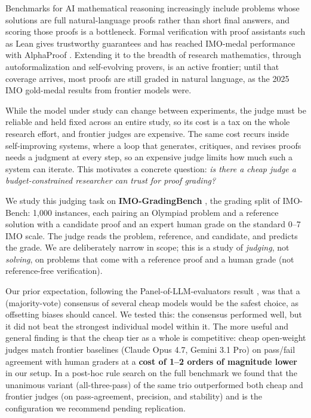 \documentclass{article}
\begin{document}
Benchmarks for AI mathematical reasoning increasingly include problems whose
solutions are full natural-language proofs rather than short final answers, and
scoring those proofs is a bottleneck. Formal verification with proof assistants
such as Lean \citep{moura2021lean} gives trustworthy guarantees and has
reached IMO-medal performance with AlphaProof \citep{hubert2025alphaproof}. Extending it to the breadth of
research mathematics, through autoformalization and self-evolving provers, is an
active frontier; until that coverage arrives, most proofs are still graded in
natural language, as the 2025 IMO gold-medal results from frontier models were.

While the model under study can change between experiments, the judge must be
reliable and held fixed across an entire study, so its cost is a tax on the whole
research effort, and frontier judges are expensive. The same cost recurs inside
self-improving systems, where a loop that generates, critiques, and revises
proofs needs a judgment at every step, so an expensive judge limits how much such
a system can iterate. This motivates a concrete question: \emph{is there a cheap
judge a budget-constrained researcher can trust for proof grading?}

We study this judging task on \textbf{IMO-GradingBench} \citep{luong2025robust}, the
grading split of IMO-Bench: 1{,}000 instances, each pairing an Olympiad problem
and a reference solution with a candidate proof and an expert human grade on the
standard 0--7 IMO scale. The judge reads the problem, reference, and candidate,
and predicts the grade. We are deliberately narrow in scope; this is a study of
\emph{judging}, not \emph{solving}, on problems that come with a reference proof
and a human grade (not reference-free verification).

Our prior expectation, following the Panel-of-LLM-evaluators result
\citep{verga2024poll}, was that a (majority-vote) consensus of several cheap models would be
the safest choice, as offsetting biases should cancel. We tested this: the
consensus performed well, but it did not beat the strongest individual model
within it. The more useful and general finding is that the cheap tier as a whole
is competitive: cheap open-weight judges match frontier baselines (Claude Opus
4.7, Gemini 3.1 Pro) on pass/fail agreement with human graders at a
\textbf{cost of 1--2 orders of magnitude lower} in our setup. In a post-hoc rule
search on the full benchmark we found that the unanimous variant (all-three-pass)
of the same trio outperformed both cheap and frontier judges (on pass-agreement,
precision, and stability) and is the configuration we recommend pending
replication.
\end{document}
